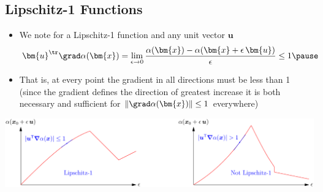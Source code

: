 
\begin{slide}
\section[-2]{Lipschitz-1 Functions}

\begin{PauseHighLight}
  \begin{itemize}
  \item We note for a Lipschitz-1 function and any unit vector $\bm{u}$
    \begin{align*}
      \bm{u}^\tr\grad \alpha(\bm{x}) = \lim_{\epsilon \rightarrow 0}
      \frac{\alpha(\bm{x})-\alpha(\bm{x}+\epsilon \, \bm{u})}{\epsilon}
      \leq 1\pause
    \end{align*}
  \item That is, at every point the gradient in all directions must be
    less than 1\pause{} (since the gradient defines the direction of greatest
    increase it is both necessary and sufficient for $\|\grad
    \alpha(\bm{x})\|\leq1$ everywhere)\pauseb
  \end{itemize}
  \begin{center}
    \includegraphics[width=\linewidth]{Lipschitz1}\pause
  \end{center}
\end{PauseHighLight}
  

\end{slide}




